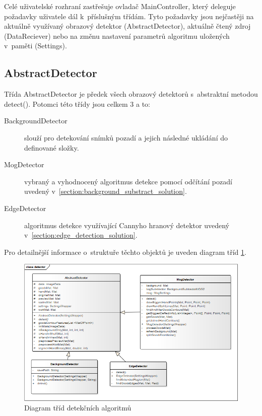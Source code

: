     Celé uživatelské rozhraní zastřešuje ovladač MainController, který deleguje požadavky uživatele dál k~příslušným třídám. Tyto požadavky jsou nejčastěji na aktuálně využívaný obrazový detektor (AbstractDetector), aktuálně čtený zdroj (DataReciever) nebo na změnu nastavení parametrů algoritmu uložených v~paměti (Settings).    
    
	\subsection{AbstractDetector}
    Třída AbstractDetector je předek všech obrazový detektorů s~abstraktní metodou detect(). Potomci této třídy jsou celkem 3 a to: 
    \begin{description}
    \item [BackgroundDetector] slouží pro detekování snímků pozadí a jejich následné ukládání do definované složky.
    \item [MogDetector] vybraný a vyhodnocený algoritmus detekce pomocí odčítání pozadí uvedený v~\ref{section:background_substract_solution}.
    \item [EdgeDetector] algoritmus detekce využívající Cannyho hranový detektor uvedený v~\ref{section:edge_detection_solution}.
    \end{description}
     Pro detailnější informace o~struktuře těchto objektů je uveden diagram tříd \ref{fig:ea_class_detector}.

    \begin{figure}[h]
      \centering
      \includegraphics[width=1\textwidth]{images/ea_class_detector.png}
      \caption{Diagram tříd detekčních algoritmů}
      \label{fig:ea_class_detector}
    \end{figure} 
    
